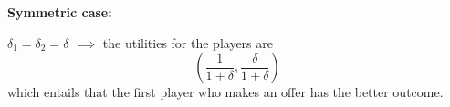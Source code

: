 \bigskip
\noindent \textbf{Symmetric case:} 

\noindent $\delta_1 = \delta_2 = \delta$ $\implies$ the utilities for the players are
\[
	\left( \frac{1}{1 + \delta}, \frac{\delta}{1 + \delta} \right)
\]
which entails that the first player who makes an offer has the better outcome.


%
%
%
%
%
%
%
%
%	
%	
%	
%	
%	

%
